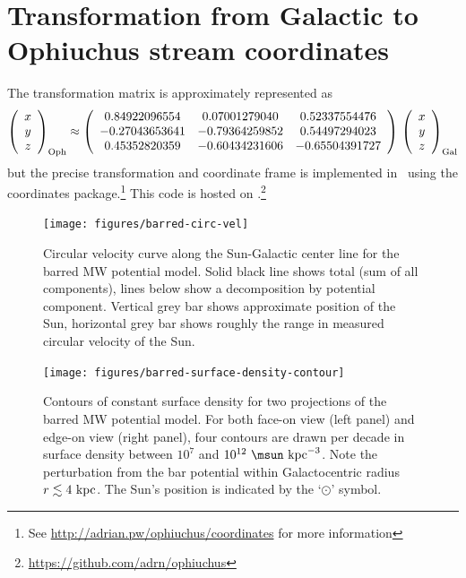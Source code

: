 \documentclass[letterpaper,12pt,preprint]{aastex}
\begin{document}
\section{Transformation from Galactic to Ophiuchus stream coordinates} \label{sec:rotationmatrix}
The transformation matrix is approximately represented as
\begin{equation*}
\left( \begin{array}{c}
x \\
y \\
z \end{array} \right)_{\rm Oph} \approx
\left( \begin{array}{ccc}
0.84922096554 & 0.07001279040 & 0.52337554476\\
-0.27043653641 & -0.79364259852 &  0.54497294023\\
0.45352820359 & -0.60434231606 & -0.65504391727
\end{array} \right) \,
\left( \begin{array}{c}
x \\
y \\
z \end{array} \right)_{\rm Gal}
\end{equation*}
but the precise transformation and coordinate frame is implemented in \python\ using the  coordinates package.\footnote{See \url{http://adrian.pw/ophiuchus/coordinates} for more information}  This code is hosted on .\footnote{\url{https://github.com/adrn/ophiuchus}} 

\clearpage
\begin{figure}[p]
\begin{center}
\texttt{[image: figures/barred-circ-vel]}
\caption{Circular velocity curve along the Sun-Galactic center line for the barred MW potential model. Solid black line shows total (sum of all components), lines below show a decomposition by potential component. Vertical grey bar shows approximate position of the Sun, horizontal grey bar shows roughly the range in measured circular velocity of the Sun.}
\label{fig:circ-vel-barred}
\end{center}
\end{figure}

\clearpage
\begin{figure}[p]
\begin{center}
\texttt{[image: figures/barred-surface-density-contour]}
\caption{Contours of constant surface density for two projections of the barred MW potential model. For both face-on view (left panel) and edge-on view (right panel), four contours are drawn per decade in surface density between $10^7$ and $10^{12}~\msun~{\rm kpc}^{-3}$. Note the perturbation from the bar potential within Galactocentric radius $r \lesssim 4~{\rm kpc}$. The Sun's position is indicated by the `$\odot$' symbol.}
\label{fig:surface-density-barred}
\end{center}
\end{figure}
\end{document}
